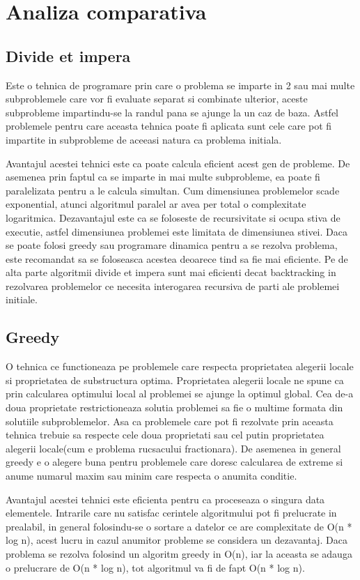 \documentclass[runningheads]{llncs}
\begin{document}
\section{Analiza comparativa}
\subsection{Divide et impera}
Este o tehnica de programare prin care o problema se imparte in 2 sau mai multe subproblemele care vor fi
evaluate separat si combinate ulterior, aceste subprobleme impartindu-se la randul pana se ajunge la un caz
de baza. Astfel problemele pentru care aceasta tehnica poate fi aplicata sunt cele care pot fi impartite in
subprobleme de aceeasi natura ca problema initiala.

Avantajul acestei tehnici este ca poate calcula eficient acest gen de probleme. De asemenea prin faptul ca
se imparte in mai multe subprobleme, ea poate fi paralelizata pentru a le calcula simultan. Cum dimensiunea
problemelor scade exponential, atunci algoritmul paralel ar avea per total o complexitate logaritmica. 
Dezavantajul este ca se foloseste de recursivitate si ocupa stiva de executie, astfel dimensiunea problemei este limitata de
dimensiunea stivei. Daca se poate folosi greedy sau programare dinamica pentru a se rezolva problema,
este recomandat sa se foloseasca acestea deoarece tind sa fie mai eficiente. Pe de alta parte algoritmii
divide et impera sunt mai eficienti decat backtracking in rezolvarea problemelor ce necesita interogarea
recursiva de parti ale problemei initiale.
\subsection{Greedy}
O tehnica ce functioneaza pe problemele care respecta proprietatea alegerii locale si proprietatea de substructura
optima. Proprietatea alegerii locale ne spune ca prin calcularea optimului local al problemei se ajunge la
optimul global. Cea de-a doua proprietate restrictioneaza solutia problemei sa fie o multime formata din
solutiile subproblemelor. Asa ca problemele care pot fi rezolvate prin aceasta tehnica trebuie sa respecte cele
doua proprietati sau cel putin proprietatea alegerii locale(cum e problema rucsacului fractionara).
De asemenea in general greedy e o alegere buna pentru problemele care doresc calcularea de extreme
si anume numarul maxim sau minim care respecta o anumita conditie.

Avantajul acestei tehnici este eficienta pentru ca proceseaza o singura data elementele. Intrarile care nu
satisfac cerintele algoritmului pot fi prelucrate in prealabil, in general folosindu-se o sortare a datelor ce are complexitate
de O(n * log n), acest lucru in cazul anumitor probleme se considera un dezavantaj. Daca problema se rezolva
folosind un algoritm greedy in O(n), iar la aceasta se adauga o prelucrare de O(n * log n), tot algoritmul
va fi de fapt O(n * log n).
\end{document}
